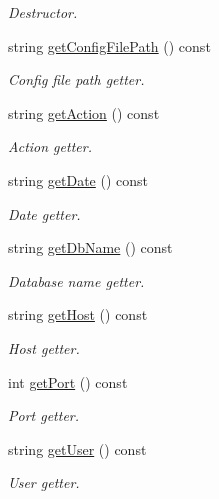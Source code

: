 \begin{DoxyCompactItemize}
\begin{DoxyCompactList}\small\item\em Destructor. \end{DoxyCompactList}\item 
string \hyperlink{classfwi_1_1CommandLineArguments_a5e55e7e9d3f3ba165a21ead751e1e145}{get\-Config\-File\-Path} () const 
\begin{DoxyCompactList}\small\item\em Config file path getter. \end{DoxyCompactList}\item 
string \hyperlink{classfwi_1_1CommandLineArguments_a744c32d84443793ba21c03959d5f80e2}{get\-Action} () const 
\begin{DoxyCompactList}\small\item\em Action getter. \end{DoxyCompactList}\item 
string \hyperlink{classfwi_1_1CommandLineArguments_a8327187e13b3f2a96cf1becc71c9f68d}{get\-Date} () const 
\begin{DoxyCompactList}\small\item\em Date getter. \end{DoxyCompactList}\item 
string \hyperlink{classfwi_1_1CommandLineArguments_a1813189cfbc370b85ed99f3b9585cebd}{get\-Db\-Name} () const 
\begin{DoxyCompactList}\small\item\em Database name getter. \end{DoxyCompactList}\item 
string \hyperlink{classfwi_1_1CommandLineArguments_a83adbcce0c83237f689b948b8860d3ee}{get\-Host} () const 
\begin{DoxyCompactList}\small\item\em Host getter. \end{DoxyCompactList}\item 
int \hyperlink{classfwi_1_1CommandLineArguments_aed3e2ce12b0d735c219352d16c936afa}{get\-Port} () const 
\begin{DoxyCompactList}\small\item\em Port getter. \end{DoxyCompactList}\item 
string \hyperlink{classfwi_1_1CommandLineArguments_a4aa0d96232454f8ba8445d6474e51b3c}{get\-User} () const 
\begin{DoxyCompactList}\small\item\em User getter. \end{DoxyCompactList}\item 

\end{DoxyCompactItemize}
